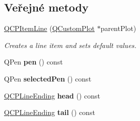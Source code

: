 \subsection*{Veřejné metody}
\begin{DoxyCompactItemize}
\item 
\hyperlink{classQCPItemLine_a17804b7f64961c6accf25b61e85142e3}{Q\+C\+P\+Item\+Line} (\hyperlink{classQCustomPlot}{Q\+Custom\+Plot} $\ast$parent\+Plot)
\begin{DoxyCompactList}\small\item\em Creates a line item and sets default values. \end{DoxyCompactList}\item 
\hypertarget{classQCPItemLine_a235779dd079a263bedb20b3daecc40eb}{}Q\+Pen {\bfseries pen} () const \label{classQCPItemLine_a235779dd079a263bedb20b3daecc40eb}

\item 
\hypertarget{classQCPItemLine_a9fde5e95a1a369008252e18f1925650c}{}Q\+Pen {\bfseries selected\+Pen} () const \label{classQCPItemLine_a9fde5e95a1a369008252e18f1925650c}

\item 
\hypertarget{classQCPItemLine_a5f6cbc5c763feae9dfbce71748fc43f1}{}\hyperlink{classQCPLineEnding}{Q\+C\+P\+Line\+Ending} {\bfseries head} () const \label{classQCPItemLine_a5f6cbc5c763feae9dfbce71748fc43f1}

\item 
\hypertarget{classQCPItemLine_a5d2ca0f784933e80f3e6e1d15dceebb3}{}\hyperlink{classQCPLineEnding}{Q\+C\+P\+Line\+Ending} {\bfseries tail} () const \label{classQCPItemLine_a5d2ca0f784933e80f3e6e1d15dceebb3}


\end{DoxyCompactItemize}

